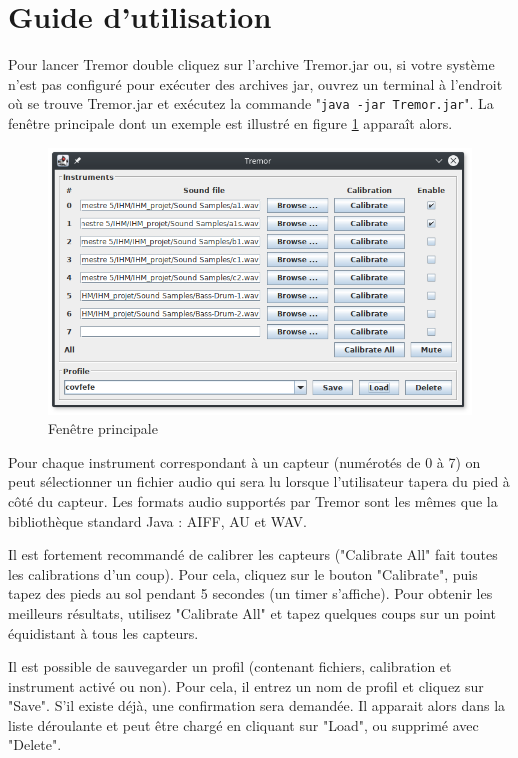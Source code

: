 \documentclass[11pt,a4paper,twoside,svgnames]{article}
\begin{document}
	\section{Guide d'utilisation}
	Pour lancer Tremor double cliquez sur l'archive Tremor.jar ou, si votre système n'est pas configuré pour exécuter des archives jar, ouvrez un terminal à l'endroit où se trouve Tremor.jar et exécutez la commande "\texttt{java -jar Tremor.jar}". La fenêtre principale dont un exemple est illustré en figure \ref{illus} apparaît alors.
	
	\begin{figure}[h]
	\includegraphics[width=\linewidth]{illus.png}
	\caption{\label{illus}Fenêtre principale}
	\end{figure}
	
	Pour chaque instrument correspondant à un capteur (numérotés de 0 à 7) on peut sélectionner un fichier audio qui sera lu lorsque l'utilisateur tapera du pied à côté du capteur. Les formats audio supportés par Tremor sont les mêmes que la bibliothèque standard Java : AIFF, AU et WAV.
	
	Il est fortement recommandé de calibrer les capteurs ("Calibrate All" fait toutes les calibrations d'un coup). Pour cela, cliquez sur le bouton "Calibrate", puis tapez des pieds au sol pendant 5 secondes (un timer s'affiche). Pour obtenir les meilleurs résultats, utilisez "Calibrate All" et tapez quelques coups sur un point équidistant à tous les capteurs.
	
	Il est possible de sauvegarder un profil (contenant fichiers, calibration et instrument activé ou non). Pour cela, il entrez un nom de profil et cliquez sur "Save". S'il existe déjà, une confirmation sera demandée. Il apparait alors dans la liste déroulante et peut être chargé en cliquant sur "Load", ou supprimé avec "Delete".
	
\end{document}
